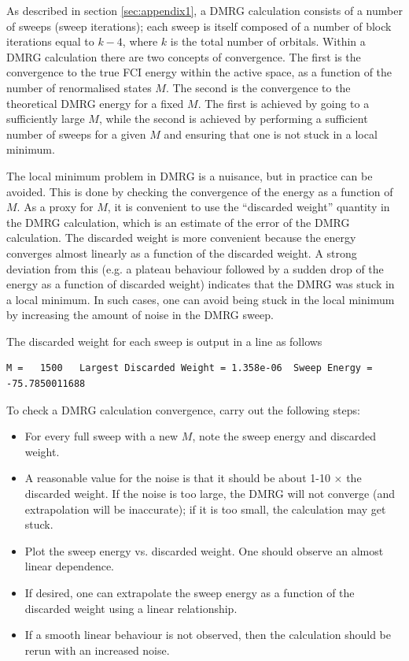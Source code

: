 \documentclass[letterpaper,12pt,aps, pra]{revtex4-1}
\begin{document}
As described in section \ref{sec:appendix1}, a DMRG calculation consists of a
number of sweeps (sweep iterations); each sweep is itself composed of a number
of block iterations equal to $k-4$, where $k$ is the total number of orbitals.
Within a DMRG calculation there are two concepts of convergence. The first is
the convergence to the true FCI energy within the active space, as a function
of the number of renormalised states $M$. The second is the convergence to the
theoretical DMRG energy for a fixed $M$. The first is achieved by going to a
sufficiently large $M$, while the second is achieved by performing a sufficient
number of sweeps for a given $M$ and ensuring that one is not stuck in a local
minimum.

The local minimum problem in DMRG is a nuisance, but in practice can be
avoided.  This is done by checking the convergence of the energy as a function
of $M$.  As a proxy for $M$, it is convenient to use the ``discarded weight''
quantity in the DMRG calculation, which is an estimate of the error of the DMRG
calculation. The discarded weight is more convenient because the energy
converges almost linearly as a function of the discarded weight. A strong
deviation from this (e.g. a plateau behaviour followed by a sudden drop of the
energy as a function of discarded weight) indicates that the DMRG was stuck in
a local minimum. In such cases, one can avoid being stuck in the local minimum
by increasing the amount of noise in the DMRG sweep.

The discarded weight for each sweep is output in a line as follows
\begin{verbatim}
M =   1500   Largest Discarded Weight = 1.358e-06  Sweep Energy =     -75.7850011688
\end{verbatim}

To check a DMRG calculation convergence, carry out the following steps:
\begin{itemize}
\item For every full sweep with a new $M$, note the sweep energy and discarded weight.
\item A reasonable value for the noise is that it should be about 1-10 $\times$ the discarded weight. If the noise
is too large, the DMRG will not converge (and extrapolation will be inaccurate); if it is too small, the calculation
may get stuck.
\item Plot the sweep energy vs. discarded weight. One should observe an almost linear dependence. 
\item If desired, one can extrapolate the sweep energy as a function of the discarded weight using a 
linear relationship. 
\item If a smooth linear behaviour is not observed, then the calculation should be rerun with an increased noise.
\end{itemize}
\end{document}
